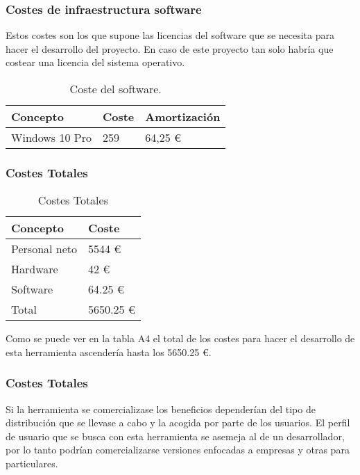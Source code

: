 \subsubsection{Costes de infraestructura software}
Estos costes son los que supone las licencias del software que se necesita para hacer el desarrollo del proyecto. En caso de este proyecto tan solo habría que costear una licencia del sistema operativo.\\

\begin{table}[H]
\begin{center}
\begin{tabular}{|l|l|l|}
\hline
Concepto & Coste & Amortización \\
\hline \hline
Windows 10 Pro & 259 & 64,25 \euro \\ \hline
\end{tabular}
\caption{Coste del software.}

\label{tabla:sencilla}
\end{center}
\end{table}

\subsubsection{Costes Totales}

\begin{table}[H]
\begin{center}
\begin{tabular}{|l|l|}
\hline
Concepto & Coste \\
\hline \hline
Personal neto & 5544 \euro \\ \hline
Hardware & 42 \euro \\ \hline
Software & 64.25 \euro \\ \hline
Total & 5650.25 \euro \\ \hline
\end{tabular}
\caption{Costes Totales}
\label{tabla:sencilla}
\end{center}
\end{table}

Como se puede ver en la tabla A4 el total de los costes para hacer el desarrollo de esta herramienta ascendería hasta los 5650.25 \euro.

\subsubsection{Costes Totales}
Si la herramienta se comercializase los beneficios dependerían del tipo de distribución que se llevase a cabo y la acogida por parte de los usuarios. El perfil de usuario que se busca con esta herramienta se asemeja al de un desarrollador, por lo tanto podrían comercializarse versiones enfocadas a empresas y otras para particulares. 

